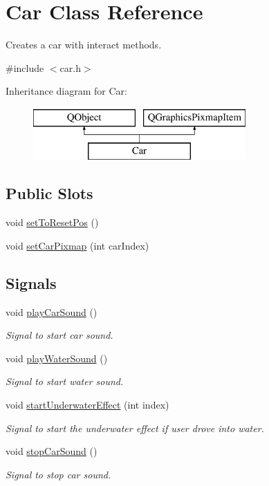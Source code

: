 \hypertarget{class_car}{}\section{Car Class Reference}
\label{class_car}


Creates a car with interact methods.  




{\ttfamily \#include $<$car.\+h$>$}

Inheritance diagram for Car\+:\begin{figure}[H]
\begin{center}
\leavevmode
\includegraphics[height=2.000000cm]{class_car}
\end{center}
\end{figure}
\subsection*{Public Slots}
\begin{DoxyCompactItemize}
\item 
void \mbox{\hyperlink{class_car_ae77af82a9549c47931e4e92f78a8b552}{set\+To\+Reset\+Pos}} ()
\item 
void \mbox{\hyperlink{class_car_aee1a1404c65f69a6cf477ac3eeea16c9}{set\+Car\+Pixmap}} (int car\+Index)
\end{DoxyCompactItemize}
\subsection*{Signals}
\begin{DoxyCompactItemize}
\item 
void \mbox{\hyperlink{class_car_a971c03c0eb6b0b4f8be93e7c3ec0207e}{play\+Car\+Sound}} ()
\begin{DoxyCompactList}\small\item\em Signal to start car sound. \end{DoxyCompactList}\item 
void \mbox{\hyperlink{class_car_a8b2c63e132d20df63f402071aeba393c}{play\+Water\+Sound}} ()
\begin{DoxyCompactList}\small\item\em Signal to start water sound. \end{DoxyCompactList}\item 
void \mbox{\hyperlink{class_car_a841ee0e366011fd34270456fa3a26fec}{start\+Underwater\+Effect}} (int index)
\begin{DoxyCompactList}\small\item\em Signal to start the underwater effect if user drove into water. \end{DoxyCompactList}\item 
void \mbox{\hyperlink{class_car_ae0287b9c9c7d30683ea0df106b8cc028}{stop\+Car\+Sound}} ()
\begin{DoxyCompactList}\small\item\em Signal to stop car sound. \end{DoxyCompactList}\end{DoxyCompactItemize}
